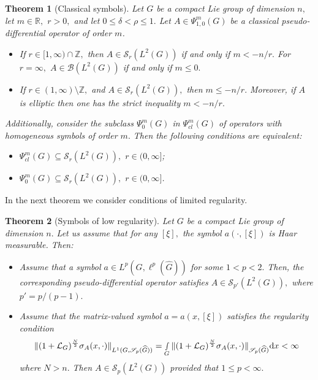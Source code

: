 \documentclass[12pt, reqno]{amsart}
\newtheorem{theorem}{Theorem}[section]
\theoremstyle{definition}
\theoremstyle{remark}
\numberwithin{equation}{section}
\begin{document}
\begin{theorem}[Classical symbols]\label{CardonaRuzhanskyChatzakouToft2022Th2}
Let $G$ be a compact Lie group of dimension $n,$ let $m\in \mathbb{R},$ $r>0, $ and let $0\leq \delta<\rho\leq 1.$    Let $A\in \Psi^{m}_{1,0}(G)$ be a classical  pseudo-differential operator of order $m$.
\begin{itemize}
    \item[(6)] If $r\in [1,\infty)\cap \mathbb{Z},$ then
$A\in \mathscr{S}_r(L^2(G))$ if and only if $m<-n/r.$ For $r=\infty,$     $A\in \mathscr{B}(L^2(G))$ if and only if $m\leq 0.$ 
\item[(7)] If $r\in (1,\infty)\setminus \mathbb{Z},$ and   $A\in \mathscr{S}_{r}(L^2(G)),$ then $m\leq -n/r.$ Moreover, if $A$ is elliptic then one has the strict inequality $m<-n/r.$
\end{itemize}
Additionally, consider the subclass $\Psi_0^m(G)$ in  $\Psi_{cl}^m(G)$  of
operators with homogeneous symbols of
order $m.$ Then
the following conditions are equivalent:
\begin{itemize}
\item[(8)] $\Psi ^m_{cl}(G)\subseteq \mathscr{S}_r(L^2(G)),$ $r\in (0,\infty]$;\


\item[(9)] $\Psi ^m_0(G)\subseteq \mathscr{S}_r(L^2(G)),$ $r\in (0,\infty]$.
\end{itemize} 
\end{theorem}
In the next theorem we consider conditions of limited regularity.
\begin{theorem}[Symbols of low regularity]\label{CardonaRuzhanskyChatzakouToft2022Th3}
Let $G$ be a compact Lie group of dimension $n.$   Let us assume that for any $[\xi],$ the symbol $a(\cdot,[\xi])$ is Haar measurable. Then:
\begin{itemize}
    \item[(10)] Assume that a symbol $a\in L^p(G,\ell^p(\widehat{G}))$ for some $1<p<2.$ Then, the corresponding pseudo-differential operator satisfies $A\in \mathscr{S}_{p'}(L^2(G)),$ where $p'=p/(p-1).$
    \item[(11)] Assume that the matrix-valued symbol $a=a(x,[\xi])$ satisfies the regularity condition
\begin{equation}
    \Vert (1+\mathcal{L}_G)^{\frac{N}{2}}\sigma_A(x,\cdot)\Vert_{L^1(G,\mathscr{S}_p(\widehat{G}))}=\smallint\limits_G\Vert (1+\mathcal{L}_G)^{\frac{N}{2}}\sigma_A(x,\cdot)\Vert_{\mathscr{S}_p(\widehat{G})}\textnormal{d}x<\infty
\end{equation}where $N>n.$ Then $A\in \mathscr{S}_{p}(L^2(G))$ provided that $1\leq p<\infty.$ 
\end{itemize}
\end{theorem}
\end{document}
